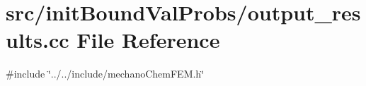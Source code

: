 \section{src/init\+Bound\+Val\+Probs/output\+\_\+results.cc File Reference}
\label{output__results_8cc}
{\ttfamily \#include \char`\"{}../../include/mechano\+Chem\+F\+E\+M.\+h\char`\"{}}\newline
